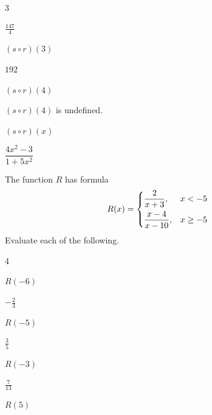 \begin{exercises}
\begin{problem}[Composition]
\begin{multicols}{3}
\begin{subproblem}
\begin{shortsolution}
			 $\frac{147}{4}$
		 \end{shortsolution}
	 \end{subproblem}
	 \begin{subproblem}
		 $(s\circ r)(3)$
		 \begin{shortsolution}
			 $192$
		 \end{shortsolution}
	 \end{subproblem}
	 \begin{subproblem}
		 $(s\circ r)(4)$
		 \begin{shortsolution}
			 $(s\circ r)(4)$ is undefined.
		 \end{shortsolution}
	 \end{subproblem}
	 \begin{subproblem}
		 $(s\circ r)(x)$
		 \begin{shortsolution}
			 $\dfrac{4x^2-3}{1+5x^2}$
		 \end{shortsolution}
	 \end{subproblem}
 \end{multicols}
 \end{problem}
 \begin{problem}
 The function $R$ has formula
 \[
	 R(x)=
	 \begin{dcases}
		 \frac{2}{x+3},    & x<-5     \\
		 \frac{x-4}{x-10}, & x\geq -5
	 \end{dcases}
 \]
 Evaluate each of the following.
 \begin{multicols}{4}
	 \begin{subproblem}
		 $R(-6)$
		 \begin{shortsolution}
			 $-\frac{2}{3}$
		 \end{shortsolution}
	 \end{subproblem}
	 \begin{subproblem}
		 $R(-5)$
		 \begin{shortsolution}
			 $\frac{3}{5}$
		 \end{shortsolution}
	 \end{subproblem}
	 \begin{subproblem}
		 $R(-3)$
		 \begin{shortsolution}
			 $\frac{7}{13}$
		 \end{shortsolution}
	 \end{subproblem}
	 \begin{subproblem}
		 $R(5)$
		 \begin{shortsolution}

\end{shortsolution}
\end{subproblem}
\end{multicols}
\end{problem}
\end{exercises}
